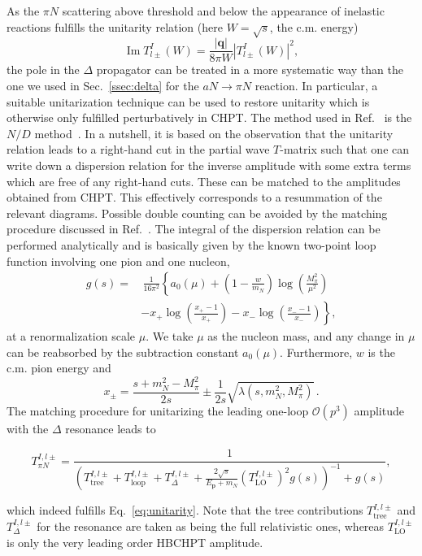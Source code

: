 \documentclass[reprint,amssymb,amsmath,floatfix,aps,prd,groupedaddress,nofootinbib]{revtex4-2}
\begin{document}
As the $\pi N$ scattering above threshold and below the appearance of inelastic reactions fulfills the unitarity
relation (here $W=\sqrt{s}$, the c.m. energy)
\begin{equation}\label{eq:unitarity}
\operatorname{Im}T_{l\pm}^I (W) = \frac{|\mathbf{q}|}{8\pi W} |T_{l\pm}^I (W)|^2,
\end{equation}
the pole in the $\Delta$ propagator can be treated in a more systematic way than the one we used in
Sec.~\ref{ssec:delta} for the $aN\to\pi N$ reaction. In particular, a suitable unitarization technique
can be used to restore unitarity which is otherwise only fulfilled perturbatively in CHPT. The method
used in Ref.~\cite{Meissner:1999vr} is the $N/D$ method~\cite{Chew:1960iv,Oller:2020guq}. In a nutshell,
it is based on the observation that the unitarity relation leads to a right-hand cut in the partial
wave $T$-matrix such that one can write down a dispersion relation for the inverse amplitude with some
extra terms which are free of any right-hand cuts. These can be matched to the amplitudes
obtained from CHPT. This effectively corresponds to a resummation of the relevant diagrams. Possible
double counting can be avoided by the matching procedure discussed in Ref.~\cite{Oller:2000fj}.
The integral of the dispersion relation can be performed analytically and is basically given by the
known two-point loop function involving one pion and one nucleon,
\begin{align}\label{eq:loopfct}
g(s) =&\, \frac{1}{16\pi^2} \left\{a_0(\mu) + \left(1 - \frac{w}{m_N}\right) \log\left(\frac{M_\pi^2}{\mu^2}\right) \right. \nonumber\\
& \left. - x_+ \log\left(\frac{x_+ - 1}{x_+}\right) - x_- \log\left(\frac{x_- - 1}{x_-}\right)\right\},
\end{align}
at a renormalization scale $\mu$. We take $\mu$ as the nucleon mass, and any change in $\mu$ can be reabsorbed by the subtraction constant $a_0(\mu)$. Furthermore, $w$ is the c.m. pion energy and
\begin{equation}
x_\pm = \frac{s + m_N^2 - M_\pi^2}{2s} \pm \frac{1}{2 s} \sqrt{\lambda (s, m_N^2, M_\pi^2)}\,.
\end{equation}
The matching procedure for unitarizing the leading one-loop $\mathcal{O}(p^3)$ amplitude with the $\Delta$ resonance leads to
\begin{widetext} 
\begin{equation}
T^{I,l\pm}_{\pi N} = \frac{1}{\left(T^{I,l\pm}_\text{tree}+T^{I,l\pm}_\text{loop}+T^{I,l\pm}_\Delta
+\frac{2\sqrt{s}}{E_\mathbf{p}+m_N} \left(T^{I,l\pm}_\text{LO}\right)^2 g(s)\right)^{-1}+g(s)},
\end{equation}
\end{widetext}
which indeed fulfills Eq.~\eqref{eq:unitarity}. Note that the tree contributions $T^{I,l\pm}_\text{tree}$
and $T^{I,l\pm}_\Delta$ for the resonance are taken as being the full relativistic ones, whereas
$T^{I,l\pm}_\text{LO}$ is only the very leading order HBCHPT amplitude.
\end{document}
